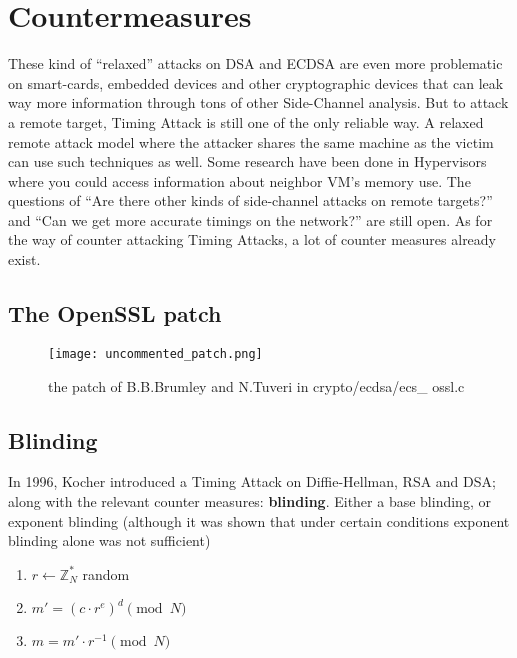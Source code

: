 \documentclass[a4paper,11pt]{article}
\begin{document}
\section{Countermeasures}

These kind of ``relaxed'' attacks on DSA and ECDSA are even more problematic on smart-cards, embedded devices and other cryptographic devices that can leak way more information through tons of other Side-Channel analysis. But to attack a remote target, Timing Attack is still one of the only reliable way. A relaxed remote attack model where the attacker shares the same machine as the victim can use such techniques as well. Some research have been done in Hypervisors where you could access information about neighbor VM's memory use\cite{flushreload}\cite{flushreloadecdsa}\cite{flushreloadopenssl}. The questions of ``Are there other kinds of side-channel attacks on remote targets?'' and ``Can we get more accurate timings on the network?'' are still open. As for the way of counter attacking Timing Attacks, a lot of counter measures already exist.

\subsection{The OpenSSL patch}



\begin{figure}[H]
\texttt{[image: uncommented\_patch.png]}
\caption{the patch of B.B.Brumley and N.Tuveri in crypto/ecdsa/ecs\_
ossl.c}
\end{figure}


\subsection{Blinding}

In 1996, Kocher introduced a Timing Attack on Diffie-Hellman, RSA and DSA; along with the relevant counter measures: \textbf{blinding}. Either a base blinding, or exponent blinding (although it was shown that under certain conditions exponent blinding alone was not sufficient)

\begin{enumerate}
\item{$r \leftarrow \mathbb{Z}_N^{\ast}$ random}
\item{$m' = (c \cdot r^e)^d \pmod{N}$}
\item{$m = m' \cdot r^{-1} \pmod{N}$}
\end{enumerate}
\end{document}
